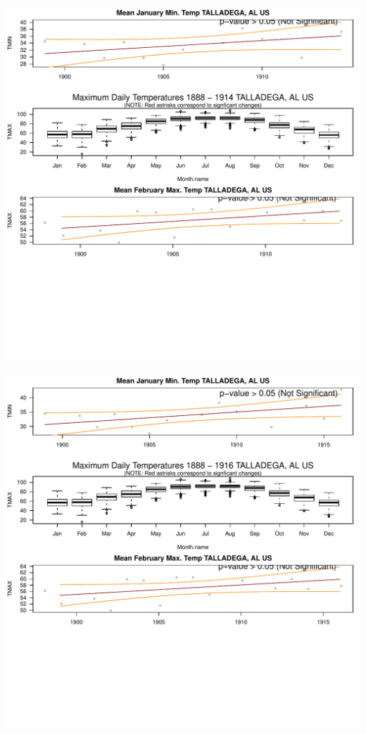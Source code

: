 \documentclass{article}\usepackage[]{graphicx}\usepackage[]{color}
\makeatletter
\def\maxwidth{ %
  \ifdim\Gin@nat@width>\linewidth
    \linewidth
  \else
    \Gin@nat@width
  \fi
}
\newenvironment{knitrout}{}{} %
\makeatother
\begin{document}
\begin{knitrout}
\includegraphics[width=\maxwidth]{figure/static_template-3} 

\includegraphics[width=\maxwidth]{figure/static_template-4} 


\end{knitrout}
\end{document}
